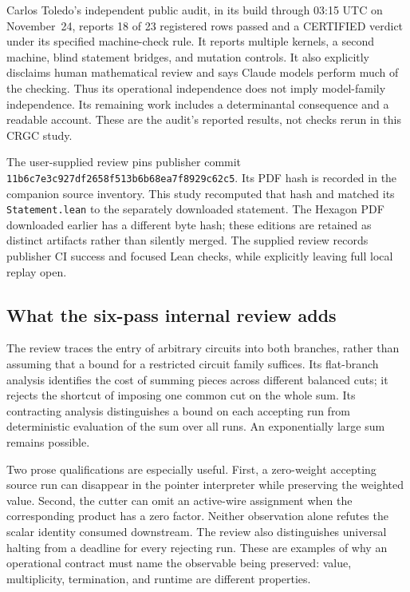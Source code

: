 \documentclass[11pt,letterpaper]{article}
\begin{document}
Carlos Toledo's independent public audit, in its build through 03:15 UTC on November~24, reports 18 of 23 registered rows passed and a CERTIFIED verdict under its specified machine-check rule. It reports multiple kernels, a second machine, blind statement bridges, and mutation controls. It also explicitly disclaims human mathematical review and says Claude models perform much of the checking. Thus its operational independence does not imply model-family independence. Its remaining work includes a determinantal consequence and a readable account. These are the audit's reported results, not checks rerun in this CRGC study.\cite{toledo}

The user-supplied review pins publisher commit
\texttt{11b6c7e3c927df2658f513b6b68ea7f8929c62c5}. Its PDF hash is recorded in the companion source inventory. This study recomputed that hash and matched its \texttt{Statement.lean} to the separately downloaded statement. The Hexagon PDF downloaded earlier has a different byte hash; these editions are retained as distinct artifacts rather than silently merged. The supplied review records publisher CI success and focused Lean checks, while explicitly leaving full local replay open.\cite{internalvp}

\subsection{What the six-pass internal review adds}
The review traces the entry of arbitrary circuits into both branches, rather than assuming that a bound for a restricted circuit family suffices. Its flat-branch analysis identifies the cost of summing pieces across different balanced cuts; it rejects the shortcut of imposing one common cut on the whole sum. Its contracting analysis distinguishes a bound on each accepting run from deterministic evaluation of the sum over all runs. An exponentially large sum remains possible.

Two prose qualifications are especially useful. First, a zero-weight accepting source run can disappear in the pointer interpreter while preserving the weighted value. Second, the cutter can omit an active-wire assignment when the corresponding product has a zero factor. Neither observation alone refutes the scalar identity consumed downstream. The review also distinguishes universal halting from a deadline for every rejecting run. These are examples of why an operational contract must name the observable being preserved: value, multiplicity, termination, and runtime are different properties.
\end{document}
